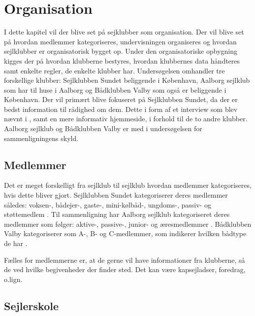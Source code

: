 \chapter{Organisation}\label{chap:organisation}

I dette kapitel vil der blive set på sejklubber som organisation. Der vil blive set på hvordan medlemmer kategoriseres,
undervisningen organiseres og hvordan sejlklubber er organisatorisk bygget op. Under den organisatoriske opbygning
kigges der på hvordan klubberne bestyres, hvordan klubbernes data håndteres samt enkelte regler, de enkelte klubber har.
Undersøgelsen omhandler tre forskellige klubber: Sejlklubben Sundet beliggende i København, Aalborg sejlklub som har
til huse i Aalborg og Bådklubben Valby som også er beliggende i København. Der vil primært blive fokuseret på
Sejlklubben Sundet, da der er bedst information til rådighed om dem. Dette i form af et interview som blev nævnt i
, samt en mere informativ hjemmeside, i forhold til de to andre klubber.
Aalborg sejlklub og Bådklubben Valby er med i undersøgelsen for sammenligningens skyld.


\section{Medlemmer}\label{sec:organisation-medlemmer}

Det er meget forskelligt fra sejlklub til sejlklub hvordan medlemmer kategoriseres, hvis dette bliver gjort.
Sejlklubben Sundet kategoriserer deres medlemmer således: voksen-, bådejer-, gaste-, mini-kølbåd-, ungdoms-, passiv- og
støttemedlem \citep{sundet_vedtaegter}. \newline
Til sammenligning har Aalborg sejlklub kategoriseret deres medlemmer som følger: aktive-, passive-, junior- og
æresmedlemmer \citep{aalborg_sejlklub_vedtaegter}. \newline
Bådklubben Valby kategoriserer som A-, B- og C-medlemmer, som indikerer hvilken bådtype de har
\citep{badklubben_valby_love}.

Fælles for medlemmerne er, at de gerne vil have informationer fra klubberne, så de ved hvilke begivenheder der finder
sted. Det kan være kapsejladser, foredrag, o.lign.


\section{Sejlerskole}\label{sec:sejlerskole}

